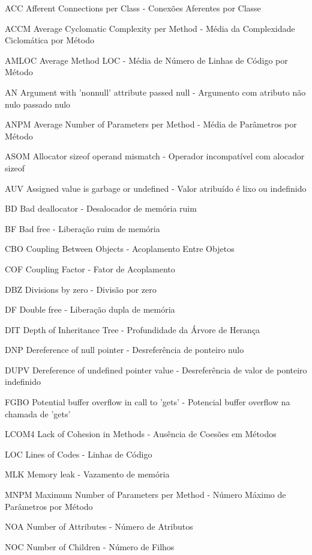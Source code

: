 \begin{siglas}
  \item[ACC] Afferent Connections per Class - Conexões Aferentes por Classe 
  \item[ACCM] Average Cyclomatic Complexity per Method - Média da Complexidade Ciclomática por Método
  \item[AMLOC] Average Method LOC - Média de Número de Linhas de Código por Método
  \item[AN] Argument with 'nonnull' attribute passed null - Argumento com atributo não nulo passado nulo
  \item[ANPM] Average Number of Parameters per Method - Média de Parâmetros por Método
  \item[ASOM] Allocator sizeof operand mismatch - Operador incompatível com alocador sizeof
  \item[AUV] Assigned value is garbage or undefined - Valor atribuído é lixo ou indefinido
  \item[BD] Bad deallocator - Desalocador de memória ruim
  \item[BF] Bad free - Liberação ruim de memória
  \item[CBO] Coupling Between Objects - Acoplamento Entre Objetos 
  \item[COF] Coupling Factor - Fator de Acoplamento
  \item[DBZ] Divisions by zero - Divisão por zero
  \item[DF] Double free - Liberação dupla de memória
  \item[DIT] Depth of Inheritance Tree - Profundidade da Árvore de Herança 
  \item[DNP] Dereference of null pointer - Desreferência de ponteiro nulo
  \item[DUPV] Dereference of undefined pointer value - Desreferência de valor de ponteiro indefinido
  \item[FGBO] Potential buffer overflow in call to 'gets' - Potencial buffer overflow na chamada de 'gets'
  \item[LCOM4] Lack of Cohesion in Methods - Ausência de Coesões em Métodos
  \item[LOC] Lines of Codes - Linhas de Código
  \item[MLK] Memory leak - Vazamento de memória
  \item[MNPM] Maximum Number of Parameters per Method - Número Máximo de Parâmetros por Método
  \item[NOA] Number of Attributes - Número de Atributos
  \item[NOC] Number of Children - Número de Filhos

\end{siglas}
